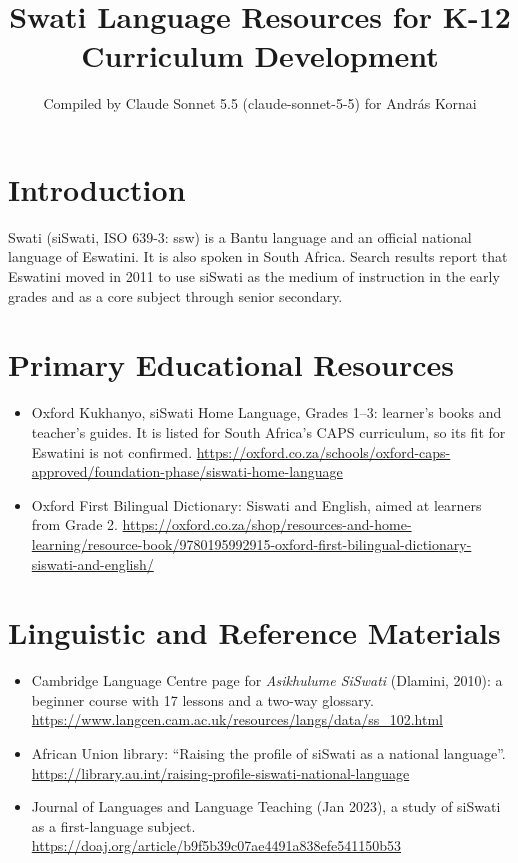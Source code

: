 \documentclass[12pt]{article}
\title{Swati Language Resources for K-12 Curriculum Development}
\author{Compiled by Claude Sonnet 5.5 (claude-sonnet-5-5) for Andr\'as Kornai}
\date{}
\begin{document}
\maketitle

\section{Introduction}
Swati (siSwati, ISO 639-3: ssw) is a Bantu language and an official national language of Eswatini. It is also spoken in South Africa. Search results report that Eswatini moved in 2011 to use siSwati as the medium of instruction in the early grades and as a core subject through senior secondary.

\section{Primary Educational Resources}
\begin{itemize}
\item Oxford Kukhanyo, siSwati Home Language, Grades 1--3: learner's books and teacher's guides. It is listed for South Africa's CAPS curriculum, so its fit for Eswatini is not confirmed. \url{https://oxford.co.za/schools/oxford-caps-approved/foundation-phase/siswati-home-language}
\item Oxford First Bilingual Dictionary: Siswati and English, aimed at learners from Grade 2. \url{https://oxford.co.za/shop/resources-and-home-learning/resource-book/9780195992915-oxford-first-bilingual-dictionary-siswati-and-english/}
\end{itemize}

\section{Linguistic and Reference Materials}
\begin{itemize}
\item Cambridge Language Centre page for \emph{Asikhulume SiSwati} (Dlamini, 2010): a beginner course with 17 lessons and a two-way glossary. \url{https://www.langcen.cam.ac.uk/resources/langs/data/ss_102.html}
\item African Union library: ``Raising the profile of siSwati as a national language''. \url{https://library.au.int/raising-profile-siswati-national-language}
\item Journal of Languages and Language Teaching (Jan 2023), a study of siSwati as a first-language subject. \url{https://doaj.org/article/b9f5b39c07ae4491a838efe541150b53}
\end{itemize}
\end{document}
